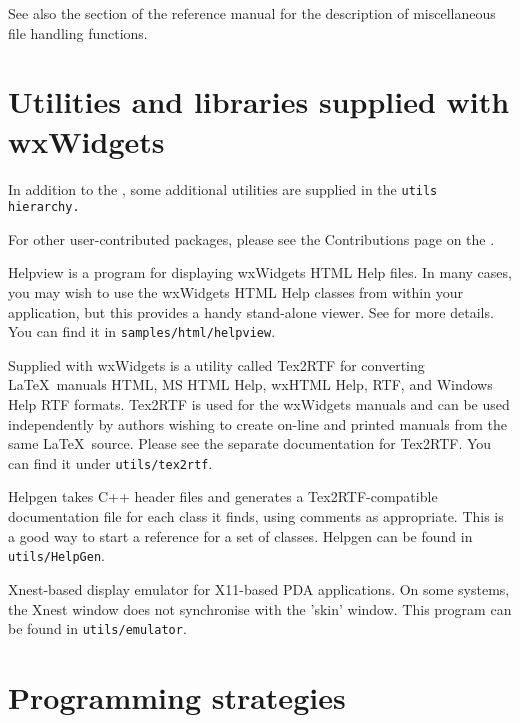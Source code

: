 See also the  section of the reference 
manual for the description of miscellaneous file handling functions.

\chapter{Utilities and libraries supplied with wxWidgets}\label{utilities}
%
\setfooter{\thepage}{}{}{}{}{\thepage}%

In addition to the , some
additional utilities are supplied in the \tt{utils} hierarchy.

For other user-contributed packages, please see the Contributions page
on the .

\begin{description}\itemsep=0pt
\item[{\bf Helpview}]
Helpview is a program for displaying wxWidgets HTML
Help files. In many cases, you may wish to use the wxWidgets HTML
Help classes from within your application, but this provides a
handy stand-alone viewer. See  for more details.
You can find it in {\tt samples/html/helpview}.
\item[{\bf Tex2RTF}]
Supplied with wxWidgets is a utility called Tex2RTF for converting\rtfsp
\LaTeX\ manuals HTML, MS HTML Help, wxHTML Help, RTF, and Windows
Help RTF formats. Tex2RTF is used for the wxWidgets manuals and can be used independently
by authors wishing to create on-line and printed manuals from the same\rtfsp
\LaTeX\ source. Please see the separate documentation for Tex2RTF.
You can find it under {\tt utils/tex2rtf}.
\item[{\bf Helpgen}]
Helpgen takes C++ header files and generates a Tex2RTF-compatible
documentation file for each class it finds, using comments as appropriate.
This is a good way to start a reference for a set of classes.
Helpgen can be found in {\tt utils/HelpGen}.
\item[{\bf Emulator}]
Xnest-based display emulator for X11-based PDA applications. On some
systems, the Xnest window does not synchronise with the
'skin' window. This program can be found in {\tt utils/emulator}.
\end{description}

\chapter{Programming strategies}\label{strategies}
%
\setfooter{\thepage}{}{}{}{}{\thepage}%

